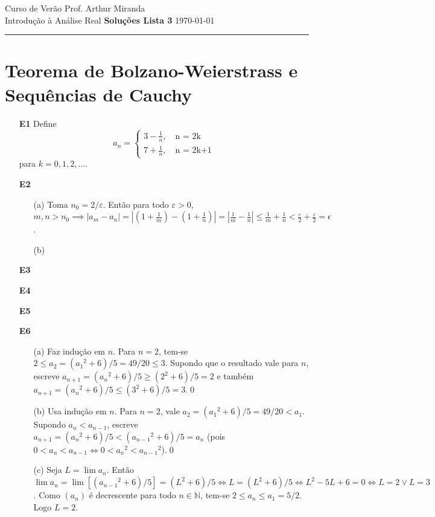 \documentclass{article}
\begin{document}
\noindent
Curso de Verão \hfill Prof. Arthur Miranda \\
\noindent
Introdução à Análise Real \hfill \textbf{\Large Soluções Lista 3} \hfill \today
\vspace{0.5mm}
\hrule

\section*{Teorema de Bolzano-Weierstrass e Sequências de Cauchy}

\begin{enumerate}
    \item [\textbf{E1}] Define \[
        a_n = \begin{cases}
            3 - \displaystyle\frac{1}{n}, \quad \text{n = 2k}\\
            7 + \displaystyle\frac{1}{n}, \quad \text{n = 2k+1}
        \end{cases}
    \] para \(k = 0, 1, 2, \ldots\).
    \item [\textbf{E2}]
        \begin{enumerate}
            \item [(a)] Toma \(n_0 = 2/\varepsilon\). Então para todo \(\varepsilon>0\), \(\displaystyle m,n > n_0 \implies |a_m-a_n| = \left|\left(1+\frac{1}{m}\right) - \left(1+\frac{1}{n}\right)\right| = \left|\frac{1}{m}-\frac{1}{n}\right| \leq \frac{1}{m} + \frac{1}{n} < \frac{\varepsilon}{2}+\frac{\varepsilon}{2} = \epsilon\).
            \item [(b)]
        \end{enumerate}
    \item [\textbf{E3}]
    \item [\textbf{E4}]
    \item [\textbf{E5}]
    \item [\textbf{E6}]
        \begin{enumerate}
            \item [(a)] Faz indução em \(n\). Para \(n=2\), tem-se \(2 \leq a_2 = ({a_1}^2+6)/5 = 49/20 \leq 3\). Supondo que o resultado vale para \(n\), escreve \(a_{n+1} = ({a_n}^2+6)/5 \geq (2^2 + 6)/5 = 2\) e também \(a_{n+1} = ({a_n}^2+6)/5 \leq (3^2+6)/5 = 3\).\qed
            \item [(b)] Usa indução em \(n\). Para \(n=2\), vale \(a_2 = ({a_1}^2+6)/5 = 49/20 < a_1\). Supondo \(a_n < a_{n-1}\), escreve \(a_{n+1} = ({a_n}^2+6)/5 < ({a_{n-1}}^2+6)/5 = a_n\) (pois \(0 < a_n < a_{n-1} \iff 0 < {a_n}^2 < {a_{n-1}}^2\)).\qed
            \item [(c)] Seja \(L = \lim a_n\). Então \(\lim a_n = \lim [({a_{n-1}}^2+6)/5] = (L^2+6)/5 \iff L = (L^2+6)/5 \iff L^2 - 5L + 6 = 0 \iff L = 2 \lor L = 3\). Como \((a_n)\) é decrescente para todo \(n \in \mathbb{N}\), tem-se \(2 \leq a_n \leq a_1 = 5/2\). Logo \(L = 2\).

\end{enumerate}
\end{enumerate}
\end{document}
